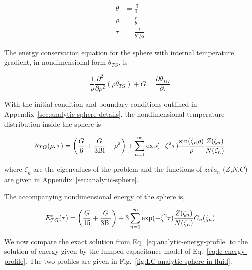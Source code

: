 \begin{align*}
    \theta &= \frac{\mathbb{T}}{\mathbb{T}_0}\\
    \rho & = \frac{r}{b}\\
    \tau & = \frac{t}{b^2/\alpha}
\end{align*}

The energy conservation equation for the sphere with internal temperature gradient, in nondimensional form $\theta_{TG}$, is

\begin{equation}
    \frac{1}{\rho}\frac{\partial^2}{\partial \rho^2}(\rho\theta_{TG}) + G = \frac{\partial\theta_{TG}}{\partial \tau}
\end{equation}

With the initial condition and boundary conditions outlined in Appendix~\ref{sec:analytic-sphere-details}, the nondimensional temperature distribution inside the sphere is 

\begin{equation}\label{eq:analytic-temperature-distribution}
    \theta_{TG}(\rho,\tau) = \left(\frac{G}{6} + \frac{G}{3\mathrm{Bi}}-\rho^2\right)  +   \sum_{n=1}^\infty \exp(-\zeta^2 \tau) \frac{\sin(\zeta_n \rho)}{\rho} \frac{Z(\zeta_n)}{N(\zeta_n)}  
\end{equation}

where $\zeta_n$ are the eigenvalues of the problem and the functions of $zeta_n$ ($Z$,$N$,$C$) are given in Appendix~\ref{sec:analytic-sphere}. 

The accompanying nondimensional energy of the sphere is,

\begin{equation}
\label{eq:analytic-energy-profile}
    E^*_{TG}(\tau)=\left(\frac{G}{15}+\frac{G}{3\mathrm{Bi}}\right)+3\sum_{n=1}^\infty \exp(-\zeta^2 \tau) \frac{Z(\zeta_n)}{N(\zeta_n)} C_n(\zeta_n)
\end{equation}

We now compare the exact solution from Eq.~\ref{eq:analytic-energy-profile} to the solution of energy given by the lumped capacitance model of Eq.~\ref{eq:lc-energy-profile}. The two profiles are given in Fig.~\ref{fig:LC-analytic-sphere-in-fluid}. 

